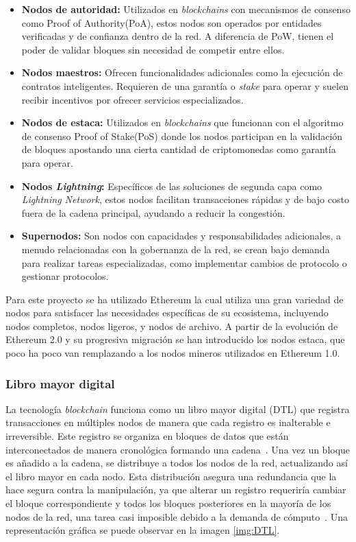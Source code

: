 \begin{itemize}
\item \textbf{Nodos de autoridad:} Utilizados en \textit{blockchains} con mecanismos de consenso como Proof of Authority(PoA), estos nodos son operados por entidades verificadas y de confianza dentro de la red. A diferencia de PoW, tienen el poder de validar bloques sin necesidad de competir entre ellos.

\item \textbf{Nodos maestros:} Ofrecen funcionalidades adicionales como la ejecución de contratos inteligentes. Requieren de una garantía o \textit{stake} para operar y suelen recibir incentivos por ofrecer servicios especializados.

\item \textbf{Nodos de estaca:} Utilizados en \textit{blockchains} que funcionan con el algoritmo de consenso Proof of Stake(PoS) donde los nodos participan en la validación de bloques apostando una cierta cantidad de criptomonedas como garantía para operar.

\item \textbf{Nodos \textit{Lightning}:} Específicos de las soluciones de segunda capa como \textit{Lightning Network}, estos nodos facilitan transacciones rápidas y de bajo costo fuera de la cadena principal, ayudando a reducir la congestión.

\item \textbf{Supernodos:} Son nodos con capacidades y responsabilidades adicionales, a menudo relacionadas con la gobernanza de la red, se crean bajo demanda para realizar tareas especializadas, como implementar cambios de protocolo o gestionar protocolos.
\end{itemize}

Para este proyecto se ha utilizado Ethereum la cual utiliza una gran variedad de nodos para satisfacer las necesidades específicas de su ecosistema, incluyendo nodos completos, nodos ligeros, y nodos de archivo. A partir de la evolución de Ethereum 2.0 y su progresiva migración se han introducido los nodos estaca, que poco ha poco van remplazando a los nodos mineros utilizados en Ethereum 1.0.


\subsubsection{Libro mayor digital}

La tecnología \textit{blockchain} funciona como un libro mayor digital (DTL) que registra transacciones en múltiples nodos de manera que cada registro es inalterable e irreversible. 
Este registro se organiza en bloques de datos que están interconectados de manera cronológica formando una cadena~\cite{wiki:DTL}.
Una vez un bloque es añadido a la cadena, se distribuye a todos los nodos de la red, actualizando así el libro mayor en cada nodo. Esta distribución asegura una redundancia que la hace segura contra la manipulación, ya que alterar un registro requeriría cambiar el bloque correspondiente y todos los bloques posteriores en la mayoría de los nodos de la red, una tarea casi imposible debido a la demanda de cómputo~\cite{BlockchainFuncionamiento}.
 Una representación gráfica se puede observar en la imagen \ref{img:DTL}.

